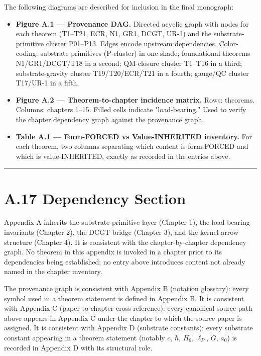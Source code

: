 \documentclass[11pt]{book}
\begin{document}
The following diagrams are described for inclusion in the final monograph:

\begin{itemize}
\item \textbf{Figure A.1 — Provenance DAG.} Directed acyclic graph with nodes for each theorem (T1–T21, ECR, N1, GR1, DCGT, UR-1) and the substrate-primitive cluster {P01–P13}. Edges encode upstream dependencies. Color-coding: substrate primitives (P-cluster) in one shade; foundational theorems N1/GR1/DCGT/T18 in a second; QM-closure cluster T1–T16 in a third; substrate-gravity cluster T19/T20/ECR/T21 in a fourth; gauge/QC cluster T17/UR-1 in a fifth.
\item \textbf{Figure A.2 — Theorem-to-chapter incidence matrix.} Rows: theorems. Columns: chapters 1–15. Filled cells indicate "load-bearing." Used to verify the chapter dependency graph against the provenance graph.
\item \textbf{Table A.1 — Form-FORCED vs Value-INHERITED inventory.} For each theorem, two columns separating which content is form-FORCED and which is value-INHERITED, exactly as recorded in the entries above.
\end{itemize}

\bigskip\hrule\bigskip

\section{A.17 Dependency Section}

Appendix A inherits the substrate-primitive layer (Chapter 1), the load-bearing invariants (Chapter 2), the DCGT bridge (Chapter 3), and the kernel-arrow structure (Chapter 4). It is consistent with the chapter-by-chapter dependency graph. No theorem in this appendix is invoked in a chapter prior to its dependencies being established; no entry above introduces content not already named in the chapter inventory.

The provenance graph is consistent with Appendix B (notation glossary): every symbol used in a theorem statement is defined in Appendix B. It is consistent with Appendix C (paper-to-chapter cross-reference): every canonical-source path above appears in Appendix C under the chapter to which the source paper is assigned. It is consistent with Appendix D (substrate constants): every substrate constant appearing in a theorem statement (notably $c$, $\hbar$, $H_0$, $\ell_P$, $G$, $a_0$) is recorded in Appendix D with its structural role.
\end{document}
